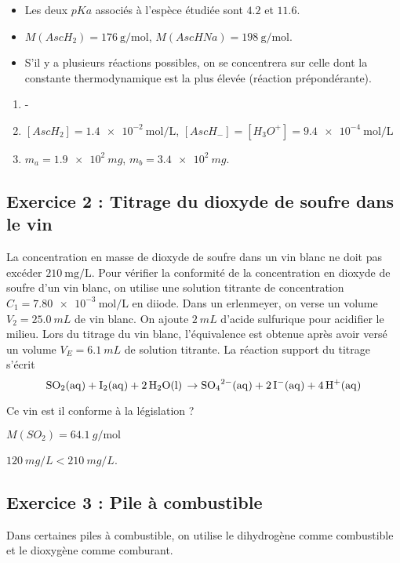 \begin{itemize}
	\item Les deux $pKa$ associés à l'espèce étudiée sont $4.2$ et $11.6$.
	\item $M(AscH_2) = \SI{176}{\gram \per \mol}$, $M(AscHNa) = \SI{198}{\gram \per \mol}$.
	\item S'il y a plusieurs réactions possibles, on se concentrera sur celle dont la constante thermodynamique est la plus élevée (réaction prépondérante).
\end{itemize} 

\begin{enumerate}
	\item -
	\item $[AscH_2] = \SI{1.4e-2}{\mol\per\liter}$, $[AscH_-] = [H_3O^+] = \SI{9.4e-4}{\mol\per\liter}$
	\item $m_a = \SI{1.9e2}{mg}$, $m_b=\SI{3.4e2}{mg}$.
\end{enumerate}

\subsection{Exercice 2 : Titrage du dioxyde de soufre dans le vin}

La concentration en masse de dioxyde de soufre dans un vin blanc ne doit pas excéder $\SI{210}{\milli\gram\per\liter}$. Pour vérifier la conformité de la concentration en dioxyde de soufre d'un vin blanc, on utilise une solution titrante de concentration $C_1 = \SI{7.80e-3}{\mol\per\liter}$ en diiode. Dans un erlenmeyer, on verse un volume $V_2 = \SI{25.0}{mL}$ de vin blanc. On ajoute $\SI{2}{mL}$ d'acide sulfurique pour acidifier le milieu. Lors du titrage du vin blanc, l'équivalence est obtenue après avoir versé un volume $V_E = \SI{6.1}{mL}$ de solution titrante. La réaction support du titrage s'écrit $$\ce{SO2(aq) + I2(aq) + 2H2O(l) \rightarrow SO4^{2-}(aq) + 2I-(aq) + 4H+(aq)}$$

Ce vin est il conforme à la législation ?

 $M(SO_2) = \SI{64.1}{g\per\mol}$

 $\SI{120}{mg/L} < \SI{210}{mg/L}$.

\subsection{Exercice 3 : Pile à combustible}

Dans certaines piles à combustible, on utilise le dihydrogène comme combustible et le dioxygène comme comburant. 

